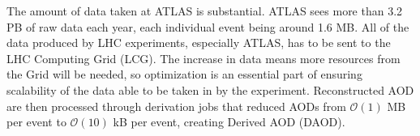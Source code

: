 The amount of data taken at ATLAS is substantial.
ATLAS sees more than 3.2 PB of raw data each year, each individual event being around 1.6 MB. \cite{ATLAS_Fact_Sheet} 
All of the data produced by LHC experiments, especially ATLAS, has to be sent to the LHC Computing Grid (LCG). 
The increase in data means more resources from the Grid will be needed, so optimization is an essential part of ensuring scalability of the data able to be taken in by the experiment.
Reconstructed AOD are then processed through derivation jobs that reduced AODs from  $\mathcal{O}(1)$ MB per event to $\mathcal{O}(10)$ kB per event, creating Derived AOD (DAOD). 

